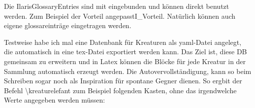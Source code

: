 \documentclass{Ilaris}
\begin{document}

Die IlarisGlossaryEntries sind mit eingebunden und können direkt benutzt werden. Zum Beispiel der Vorteil \gls{angepasstI_Vorteil}. Natürlich können auch eigene
\gls{glossareinträge} eingetragen werden.



\spaltenumbruch

Testweise habe ich mal eine Datenbank für Kreaturen als yaml-Datei angelegt, die automatisch in eine tex-Datei exportiert werden kann. Das Ziel ist, diese DB gemeinsam zu erweitern und in Latex können die Blöcke für jede Kreatur in der Sammlung automatisch erzeugt werden. Die Autovervollständigung, kann so beim Schreiben sogar noch als Inspiration für spontane Gegner dienen. So ergbit der Befehl \textbackslash kreaturelefant zum Beispiel folgenden Kasten, ohne das irgendwelche Werte angegeben werden müssen:

\kreaturelefant

\kreaturbaumdrache

\spaltenende


\renewcommand*{\glossarysection}[2][]{%
    \twocolumn[{\chapter*{#2}}]%
    \setlength\glsdescwidth{0.6\linewidth}%
    \glsglossarymark{\glossarytoctitle}%
}
\renewcommand*{\glossarypostamble}{\onecolumn}

\glossar
\end{document}
